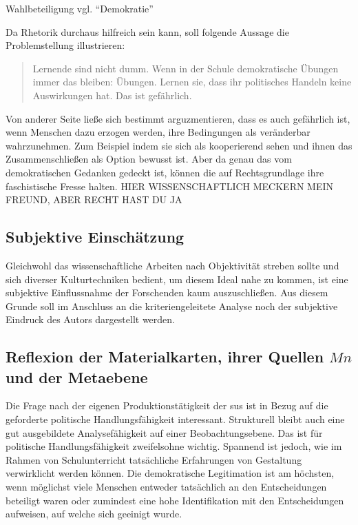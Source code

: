 
Wahlbeteiligung vgl. \enquote{Demokratie}

Da Rhetorik durchaus hilfreich sein kann, soll folgende Aussage die Problemstellung illustrieren:
\begin{quote}
    Lernende sind nicht dumm. Wenn in der Schule demokratische Übungen immer das bleiben: Übungen. Lernen sie, dass ihr politisches Handeln keine Auswirkungen hat. Das ist gefährlich.
\end{quote}

Von anderer Seite ließe sich bestimmt arguzmentieren, dass es auch gefährlich ist, wenn Menschen dazu erzogen werden, ihre Bedingungen als veränderbar wahrzunehmen. Zum Beispiel indem sie sich als kooperierend sehen und ihnen das Zusammenschließen als Option bewusst ist.
Aber da genau das vom demokratischen Gedanken gedeckt ist, können die auf Rechtsgrundlage ihre faschistische Fresse halten. HIER WISSENSCHAFTLICH MECKERN MEIN FREUND, ABER RECHT HAST DU JA


\subsection{Subjektive Einschätzung}
Gleichwohl das wissenschaftliche Arbeiten nach Objektivität streben sollte und sich diverser Kulturtechniken bedient, um diesem Ideal nahe zu kommen, ist eine subjektive Einflussnahme der Forschenden kaum auszuschließen. Aus diesem Grunde soll im Anschluss an %
die kriteriengeleitete Analyse noch der subjektive Eindruck des Autors dargestellt werden. 

\subsection{Reflexion der Materialkarten, ihrer Quellen $Mn$ und der Metaebene}
Die Frage nach der eigenen Produktionstätigkeit der \gls{sus} ist in Bezug auf die geforderte politische Handlungsfähigkeit interessant. Strukturell bleibt auch eine gut ausgebildete Analysefähigkeit auf einer Beobachtungsebene. Das ist für politische Handlungsfähigkeit zweifelsohne wichtig. Spannend ist jedoch, wie im Rahmen von Schulunterricht tatsächliche Erfahrungen von Gestaltung verwirklicht werden können. Die demokratische Legitimation ist am höchsten, wenn möglichst viele Menschen entweder tatsächlich an den Entscheidungen beteiligt waren oder zumindest eine hohe Identifikation mit den Entscheidungen aufweisen, auf welche sich geeinigt wurde. 

